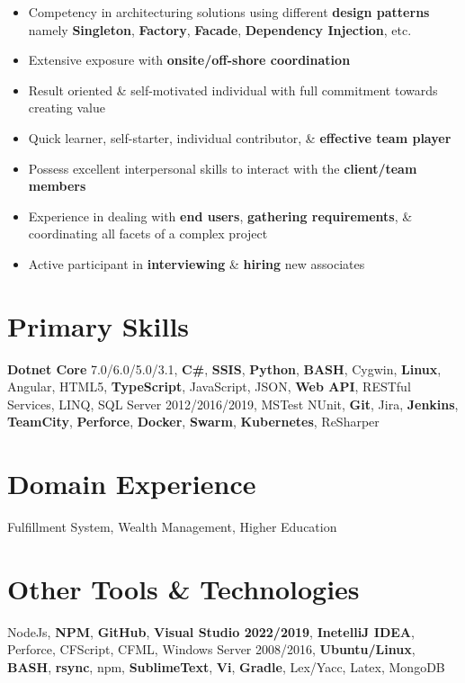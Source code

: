 \documentclass[letterpaper,11pt]{article}
\begin{document}
\begin{itemize}
    \item Competency in architecturing solutions using different \textbf{\color{darkgray}design patterns} namely \textbf{\color{darkgray}Singleton}, \textbf{\color{darkgray}Factory}, \textbf{\color{darkgray}Facade}, \textbf{\color{darkgray}Dependency Injection}, etc.
    \item Extensive exposure with \textbf{\color{darkgray}onsite/off-shore coordination}
    \item Result oriented \& self-motivated individual with full commitment towards creating value
    \item Quick learner, self-starter, individual contributor, \& \textbf{\color{darkgray}effective team player}
    \item Possess excellent interpersonal skills to interact with the \textbf{\color{darkgray}client/team members}
    \item Experience in dealing with \textbf{\color{darkgray}end users}, \textbf{\color{darkgray}gathering requirements}, \& coordinating all facets of a complex project
    \item Active participant in \textbf{\color{darkgray}interviewing} \& \textbf{\color{darkgray}hiring} new associates
\end{itemize}
\pagebreak

\section{Primary Skills}
\textbf{\color{darkgray}Dotnet Core} 7.0/6.0/5.0/3.1, \textbf{\color{darkgray}C\#}, \textbf{\color{darkgray}SSIS}, \textbf{\color{darkgray}Python}, \textbf{\color{darkgray}BASH}, Cygwin, \textbf{\color{darkgray}Linux}, Angular, HTML5, \textbf{\color{darkgray}TypeScript}, JavaScript, JSON, \textbf{\color{darkgray}Web API}, RESTful Services, LINQ, SQL Server 2012/2016/2019, MSTest NUnit, \textbf{\color{darkgray}Git}, Jira, \textbf{\color{darkgray}Jenkins}, \textbf{\color{darkgray}TeamCity}, \textbf{\color{darkgray}Perforce}, \textbf{\color{darkgray}Docker}, \textbf{\color{darkgray}Swarm}, \textbf{\color{darkgray}Kubernetes}, ReSharper

\section{Domain Experience}
Fulfillment System, Wealth Management, Higher Education

\section{Other Tools \& Technologies}
NodeJs, \textbf{\color{darkgray}NPM}, \textbf{\color{darkgray}GitHub}, \textbf{\color{darkgray}Visual Studio 2022/2019}, \textbf{\color{darkgray}InetelliJ IDEA}, Perforce, CFScript, CFML, Windows Server 2008/2016, \textbf{\color{darkgray}Ubuntu/Linux}, \textbf{\color{darkgray}BASH}, \textbf{\color{darkgray}rsync}, npm, \textbf{\color{darkgray}SublimeText}, \textbf{\color{darkgray}Vi}, \textbf{\color{darkgray}Gradle}, Lex/Yacc, Latex, MongoDB
\end{document}
